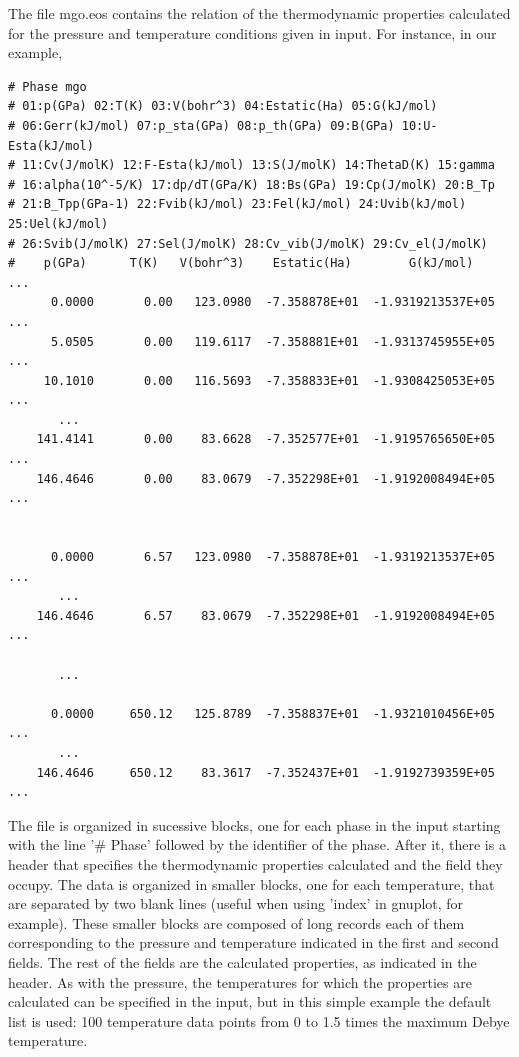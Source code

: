 \documentclass[a4paper]{article}
\begin{document}
The file mgo.eos contains the relation of the thermodynamic properties
calculated for the pressure and temperature conditions given in
input. For instance, in our example,
%
\asciilist
\begin{lstlisting}
# Phase mgo
# 01:p(GPa) 02:T(K) 03:V(bohr^3) 04:Estatic(Ha) 05:G(kJ/mol)
# 06:Gerr(kJ/mol) 07:p_sta(GPa) 08:p_th(GPa) 09:B(GPa) 10:U-Esta(kJ/mol)
# 11:Cv(J/molK) 12:F-Esta(kJ/mol) 13:S(J/molK) 14:ThetaD(K) 15:gamma
# 16:alpha(10^-5/K) 17:dp/dT(GPa/K) 18:Bs(GPa) 19:Cp(J/molK) 20:B_Tp
# 21:B_Tpp(GPa-1) 22:Fvib(kJ/mol) 23:Fel(kJ/mol) 24:Uvib(kJ/mol) 25:Uel(kJ/mol)
# 26:Svib(J/molK) 27:Sel(J/molK) 28:Cv_vib(J/molK) 29:Cv_el(J/molK)
#    p(GPa)      T(K)   V(bohr^3)    Estatic(Ha)        G(kJ/mol)    ...
      0.0000       0.00   123.0980  -7.358878E+01  -1.9319213537E+05 ...
      5.0505       0.00   119.6117  -7.358881E+01  -1.9313745955E+05 ...
     10.1010       0.00   116.5693  -7.358833E+01  -1.9308425053E+05 ...
       ...
    141.4141       0.00    83.6628  -7.352577E+01  -1.9195765650E+05 ...
    146.4646       0.00    83.0679  -7.352298E+01  -1.9192008494E+05 ...


      0.0000       6.57   123.0980  -7.358878E+01  -1.9319213537E+05 ...
       ...
    146.4646       6.57    83.0679  -7.352298E+01  -1.9192008494E+05 ...

       ...

      0.0000     650.12   125.8789  -7.358837E+01  -1.9321010456E+05 ...
       ...
    146.4646     650.12    83.3617  -7.352437E+01  -1.9192739359E+05 ...
\end{lstlisting}

The file is organized in sucessive blocks, one for each phase in the
input starting with the line '\# Phase' followed by the identifier of
the phase. After it, there is a header that specifies the
thermodynamic properties calculated and the field they occupy. The
data is organized in smaller blocks, one for each temperature, that
are separated by two blank lines (useful when using 'index' in
gnuplot, for example). These smaller blocks are composed of long
records each of them corresponding to the pressure and temperature
indicated in the first and second fields. The rest of the fields are
the calculated properties, as indicated in the header. As with the
pressure, the temperatures for which the properties are calculated can
be specified in the input, but in this simple example the default
list is used: 100 temperature data points from 0 to 1.5 times the
maximum Debye temperature.
\end{document}
